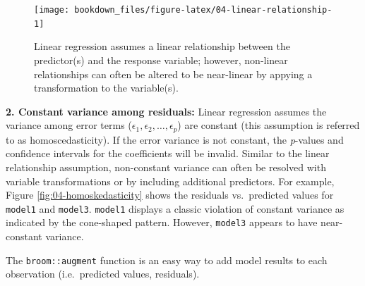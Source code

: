 \documentclass[]{krantz}
\makeatletter
\newenvironment{kframe}{%
\medskip{}
\setlength{\fboxsep}{.8em}
 \def\at@end@of@kframe{}%
 \ifinner\ifhmode%
  \def\at@end@of@kframe{\end{minipage}}%
  \begin{minipage}{\columnwidth}%
 \fi\fi%
 \def\FrameCommand##1{\hskip\@totalleftmargin \hskip-\fboxsep
 \colorbox{shadecolor}{##1}\hskip-\fboxsep
     \hskip-\linewidth \hskip-\@totalleftmargin \hskip\columnwidth}%
 \MakeFramed {\advance\hsize-\width
   \@totalleftmargin\z@ \linewidth\hsize
   \@setminipage}}%
 {\par\unskip\endMakeFramed%
 \at@end@of@kframe}
\newenvironment{block}[1]
  {
  \begin{itemize}
  \renewcommand{\labelitemi}{
    \raisebox{-.7\height}[0pt][0pt]{
      {\setkeys{Gin}{width=3em,keepaspectratio}\texttt{[image: icons/\#1]}}
    }
  }
  \setlength{\fboxsep}{1em}
  \begin{kframe}
  \item
  }
  {
  \end{kframe}
  \end{itemize}
  }
\newenvironment{tip}
  {\begin{block}{tip}}
  {\end{block}}
\makeatother
\begin{document}
\begin{figure}

{\centering \texttt{[image: bookdown\_files/figure-latex/04-linear-relationship-1]} 

}

\caption{Linear regression assumes a linear relationship between the predictor(s) and the response variable; however, non-linear relationships can often be altered to be near-linear by appying a transformation to the variable(s).}\label{fig:04-linear-relationship}
\end{figure}

\textbf{2. Constant variance among residuals:} Linear regression assumes the variance among error terms (\(\epsilon_1, \epsilon_2, \dots, \epsilon_p\)) are constant (this assumption is referred to as homoscedasticity). If the error variance is not constant, the \emph{p}-values and confidence intervals for the coefficients will be invalid. Similar to the linear relationship assumption, non-constant variance can often be resolved with variable transformations or by including additional predictors. For example, Figure \ref{fig:04-homoskedasticity} shows the residuals vs.~predicted values for \texttt{model1} and \texttt{model3}. \texttt{model1} displays a classic violation of constant variance as indicated by the cone-shaped pattern. However, \texttt{model3} appears to have near-constant variance.

\begin{tip}
The \texttt{broom::augment} function is an easy way to add model results
to each observation (i.e.~predicted values, residuals).
\end{tip}
\end{document}
